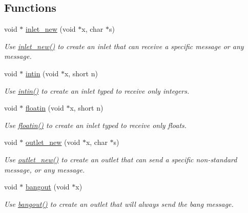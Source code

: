 \subsection*{Functions}
\begin{DoxyCompactItemize}
\item 
void $\ast$ \hyperlink{group__inout_ga7195144cee5e8b74c10c2b17b6c6472a}{inlet\_\-new} (void $\ast$x, char $\ast$s)
\begin{DoxyCompactList}\small\item\em Use \hyperlink{group__inout_ga7195144cee5e8b74c10c2b17b6c6472a}{inlet\_\-new()} to create an inlet that can receive a specific message or any message. \item\end{DoxyCompactList}\item 
void $\ast$ \hyperlink{group__inout_ga8ca68c8eafef51622f263f13e047341b}{intin} (void $\ast$x, short n)
\begin{DoxyCompactList}\small\item\em Use \hyperlink{group__inout_ga8ca68c8eafef51622f263f13e047341b}{intin()} to create an inlet typed to receive only integers. \item\end{DoxyCompactList}\item 
void $\ast$ \hyperlink{group__inout_ga01125a22c75ef028199febbe21346f0e}{floatin} (void $\ast$x, short n)
\begin{DoxyCompactList}\small\item\em Use \hyperlink{group__inout_ga01125a22c75ef028199febbe21346f0e}{floatin()} to create an inlet typed to receive only floats. \item\end{DoxyCompactList}\item 
void $\ast$ \hyperlink{group__inout_ga451b3a1ec203ac8648a5399e209f070a}{outlet\_\-new} (void $\ast$x, char $\ast$s)
\begin{DoxyCompactList}\small\item\em Use \hyperlink{group__inout_ga451b3a1ec203ac8648a5399e209f070a}{outlet\_\-new()} to create an outlet that can send a specific non-\/standard message, or any message. \item\end{DoxyCompactList}\item 
void $\ast$ \hyperlink{group__inout_ga69d26d4f2684aab7dbc1b2d18248eae5}{bangout} (void $\ast$x)
\begin{DoxyCompactList}\small\item\em Use \hyperlink{group__inout_ga69d26d4f2684aab7dbc1b2d18248eae5}{bangout()} to create an outlet that will always send the bang message. \item\end{DoxyCompactList}\item 

\end{DoxyCompactItemize}
